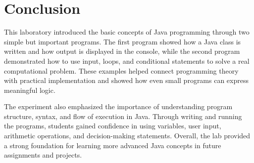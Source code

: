 \section{Conclusion}

This laboratory introduced the basic concepts of Java programming through two simple but important programs. The first program showed how a Java class is written and how output is displayed in the console, while the second program demonstrated how to use input, loops, and conditional statements to solve a real computational problem. These examples helped connect programming theory with practical implementation and showed how even small programs can express meaningful logic.

The experiment also emphasized the importance of understanding program structure, syntax, and flow of execution in Java. Through writing and running the programs, students gained confidence in using variables, user input, arithmetic operations, and decision-making statements. Overall, the lab provided a strong foundation for learning more advanced Java concepts in future assignments and projects.


